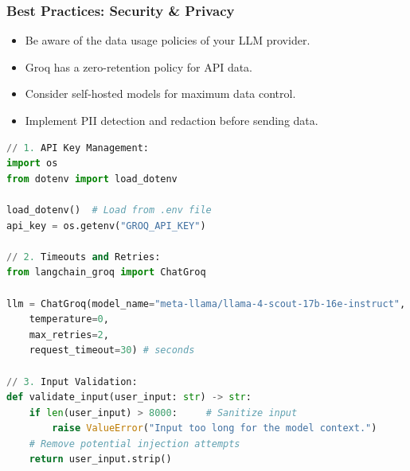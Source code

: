 \begin{frame}[fragile]\frametitle{Best Practices: Security \& Privacy}

\begin{itemize}
\item Be aware of the data usage policies of your LLM provider.
\item Groq has a zero-retention policy for API data.
\item Consider self-hosted models for maximum data control.
\item Implement PII detection and redaction before sending data.
\end{itemize}

\begin{lstlisting}[language=python, basicstyle=\tiny]
// 1. API Key Management:
import os
from dotenv import load_dotenv

load_dotenv()  # Load from .env file
api_key = os.getenv("GROQ_API_KEY")

// 2. Timeouts and Retries:
from langchain_groq import ChatGroq

llm = ChatGroq(model_name="meta-llama/llama-4-scout-17b-16e-instruct",
    temperature=0,
    max_retries=2,
    request_timeout=30) # seconds
	
// 3. Input Validation:
def validate_input(user_input: str) -> str:
    if len(user_input) > 8000:     # Sanitize input
        raise ValueError("Input too long for the model context.")
    # Remove potential injection attempts
    return user_input.strip()
\end{lstlisting}

\end{frame}


